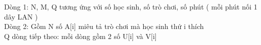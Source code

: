 Dòng 1: N, M, Q tương ứng với số học sinh, số trò chơi, số phút ( mỗi phút nối 1 dây LAN )
\\Dòng 2: Gồm N số A[i] miêu tả trò chơi mà học sinh thứ i thích
\\Q dòng tiếp theo: mỗi dòng gồm 2 số U[i] và V[i]

\